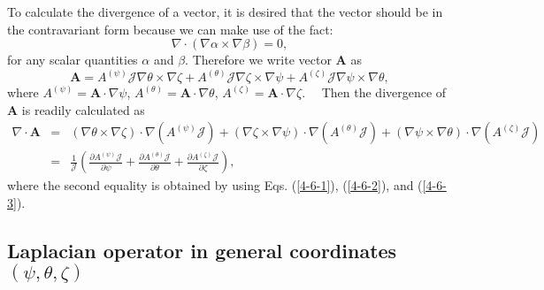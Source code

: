 \documentclass{article}
\begin{document}
To calculate the divergence of a vector, it is desired that the vector should
be in the contravariant form because we can make use of the fact:
\begin{equation}
  \nabla \cdot (\nabla \alpha \times \nabla \beta) = 0,
\end{equation}
for any scalar quantities $\alpha$ and $\beta$. Therefore we write vector
$\mathbf{A}$ as
\begin{equation}
  \mathbf{A}= A^{(\psi)} \mathcal{J} \nabla \theta \times \nabla \zeta +
  A^{(\theta)} \mathcal{J} \nabla \zeta \times \nabla \psi + A^{(\zeta)}
  \mathcal{J} \nabla \psi \times \nabla \theta,
\end{equation}
where $A^{(\psi)} =\mathbf{A} \cdot \nabla \psi$, $A^{(\theta)} =\mathbf{A}
\cdot \nabla \theta$, $A^{(\zeta)} =\mathbf{A} \cdot \nabla \zeta$. \ \ Then
the divergence of $\mathbf{A}$ is readily calculated as
\begin{eqnarray}
  \nabla \cdot \mathbf{A} & = & (\nabla \theta \times \nabla \zeta) \cdot
  \nabla (A^{(\psi)} \mathcal{J}) + (\nabla \zeta \times \nabla \psi) \cdot
  \nabla (A^{(\theta)} \mathcal{J}) + (\nabla \psi \times \nabla \theta) \cdot
  \nabla (A^{(\zeta)} \mathcal{J}) \\
  & = & \frac{1}{\mathcal{J}} \left( \frac{\partial A^{(\psi)}
  \mathcal{J}}{\partial \psi} + \frac{\partial A^{(\theta)}
  \mathcal{J}}{\partial \theta} + \frac{\partial A^{(\zeta)}
  \mathcal{J}}{\partial \zeta} \right),  \label{6-8-e5}
\end{eqnarray}
where the second equality is obtained by using Eqs. (\ref{4-6-1}),
(\ref{4-6-2}), and (\ref{4-6-3}).

\subsection{Laplacian operator in general coordinates $(\psi, \theta, \zeta)$}
\end{document}
